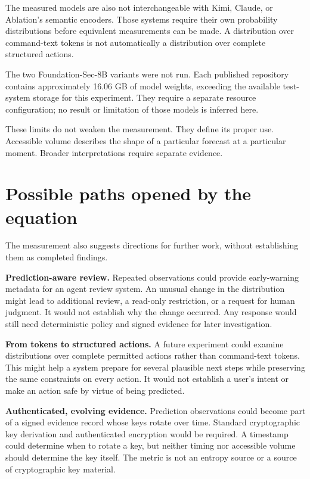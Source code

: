 \documentclass[11pt,a4paper]{article}
\begin{document}
The measured models are also not interchangeable with Kimi, Claude, or Ablation's semantic encoders. Those systems require their own probability distributions before equivalent measurements can be made. A distribution over command-text tokens is not automatically a distribution over complete structured actions.

The two Foundation-Sec-8B variants were not run. Each published repository contains approximately 16.06 GB of model weights, exceeding the available test-system storage for this experiment. They require a separate resource configuration; no result or limitation of those models is inferred here.

These limits do not weaken the measurement. They define its proper use. Accessible volume describes the shape of a particular forecast at a particular moment. Broader interpretations require separate evidence.

\section{Possible paths opened by the equation}
The measurement also suggests directions for further work, without establishing them as completed findings.

\textbf{Prediction-aware review.} Repeated observations could provide early-warning metadata for an agent review system. An unusual change in the distribution might lead to additional review, a read-only restriction, or a request for human judgment. It would not establish why the change occurred. Any response would still need deterministic policy and signed evidence for later investigation.

\textbf{From tokens to structured actions.} A future experiment could examine distributions over complete permitted actions rather than command-text tokens. This might help a system prepare for several plausible next steps while preserving the same constraints on every action. It would not establish a user's intent or make an action safe by virtue of being predicted.

\textbf{Authenticated, evolving evidence.} Prediction observations could become part of a signed evidence record whose keys rotate over time. Standard cryptographic key derivation and authenticated encryption would be required. A timestamp could determine when to rotate a key, but neither timing nor accessible volume should determine the key itself. The metric is not an entropy source or a source of cryptographic key material.
\end{document}
